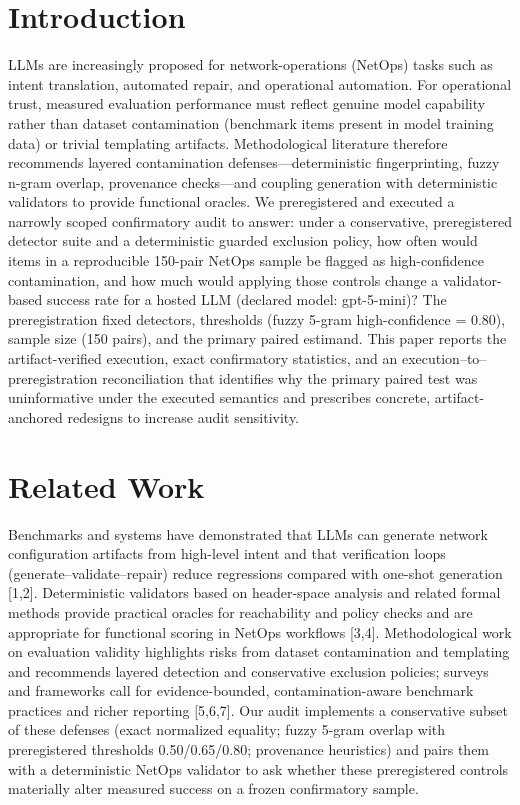 \documentclass[conference]{IEEEtran}
\begin{document}
\section{Introduction}
LLMs are increasingly proposed for network-operations (NetOps) tasks such as intent translation, automated repair, and operational automation. For operational trust, measured evaluation performance must reflect genuine model capability rather than dataset contamination (benchmark items present in model training data) or trivial templating artifacts. Methodological literature therefore recommends layered contamination defenses---deterministic fingerprinting, fuzzy n-gram overlap, provenance checks---and coupling generation with deterministic validators to provide functional oracles. We preregistered and executed a narrowly scoped confirmatory audit to answer: under a conservative, preregistered detector suite and a deterministic guarded exclusion policy, how often would items in a reproducible 150-pair NetOps sample be flagged as high-confidence contamination, and how much would applying those controls change a validator-based success rate for a hosted LLM (declared model: gpt-5-mini)? The preregistration fixed detectors, thresholds (fuzzy 5-gram high-confidence = 0.80), sample size (150 pairs), and the primary paired estimand. This paper reports the artifact-verified execution, exact confirmatory statistics, and an execution--to--preregistration reconciliation that identifies why the primary paired test was uninformative under the executed semantics and prescribes concrete, artifact-anchored redesigns to increase audit sensitivity.

\section{Related Work}
Benchmarks and systems have demonstrated that LLMs can generate network configuration artifacts from high-level intent and that verification loops (generate--validate--repair) reduce regressions compared with one-shot generation [1,2]. Deterministic validators based on header-space analysis and related formal methods provide practical oracles for reachability and policy checks and are appropriate for functional scoring in NetOps workflows [3,4]. Methodological work on evaluation validity highlights risks from dataset contamination and templating and recommends layered detection and conservative exclusion policies; surveys and frameworks call for evidence-bounded, contamination-aware benchmark practices and richer reporting [5,6,7]. Our audit implements a conservative subset of these defenses (exact normalized equality; fuzzy 5-gram overlap with preregistered thresholds 0.50/0.65/0.80; provenance heuristics) and pairs them with a deterministic NetOps validator to ask whether these preregistered controls materially alter measured success on a frozen confirmatory sample.
\end{document}
